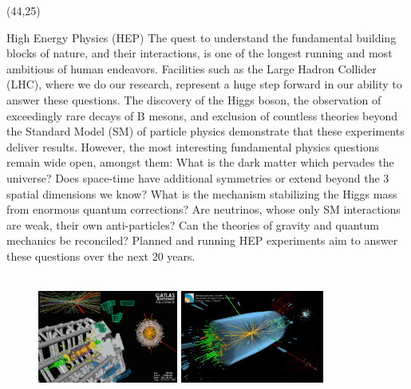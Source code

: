 \documentclass[final]{beamer}
\begin{document}
\begin{frame}{}
\begin{textblock}{38.0}(44,25)
\begin{block}{High Energy Physics (HEP)}
The quest to understand the fundamental building blocks of nature,
and their interactions, is one of the longest running and most
ambitious of human endeavors. Facilities such as the Large Hadron
Collider (LHC), where we do our research, represent a huge step
forward in our ability to answer these questions. The discovery of
the Higgs boson, the observation of exceedingly rare decays of B
mesons, and exclusion of countless theories beyond the Standard
Model (SM) of particle physics demonstrate that these experiments
deliver results. However, the most interesting fundamental physics
questions remain wide open, amongst them: What is the dark matter
which pervades the universe? Does space-time have additional
symmetries or extend beyond the 3 spatial dimensions we know? What
is the mechanism stabilizing the Higgs mass from enormous quantum
corrections? Are neutrinos, whose only SM interactions are weak,
their own anti-particles? Can the theories of gravity and quantum
mechanics be reconciled? Planned and running HEP experiments 
aim to answer these questions over the next 20 years.
~~~ \\
~~~ \\
\begin{figure}[tbph]
\centering
\includegraphics[width=0.41\textwidth]{images/run204769_evt71902630_VP1Base-half.png}
\includegraphics[width=0.42\textwidth]{images/eemm_run195099_evt137440354_ispy_3d-annotated-2.png}
\end{figure}
\end{block}
\end{textblock}


\end{frame}
\end{document}
